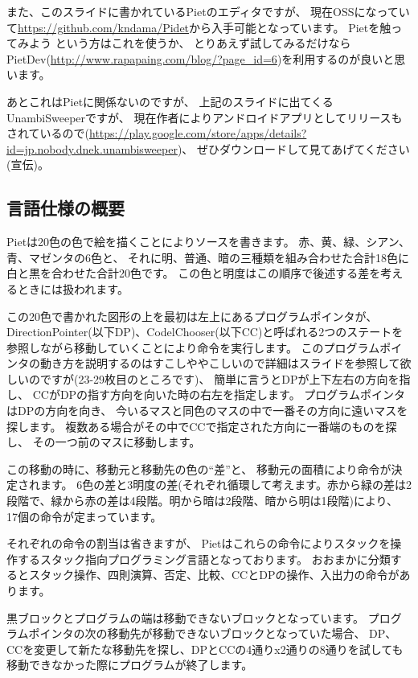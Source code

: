 また、このスライドに書かれているPietのエディタですが、
現在OSSになっていて\url{https://github.com/kndama/Pidet}から入手可能となっています。
Pietを触ってみよう という方はこれを使うか、
とりあえず試してみるだけならPietDev(\url{http://www.rapapaing.com/blog/?page\_id=6})を利用するのが良いと思います。

あとこれはPietに関係ないのですが、
上記のスライドに出てくるUnambiSweeperですが、
現在作者によりアンドロイドアプリとしてリリースもされているので(\url{https://play.google.com/store/apps/details?id=jp.nobody.dnek.unambisweeper})、
ぜひダウンロードして見てあげてください(宣伝)。

\subsection{言語仕様の概要}

Pietは20色の色で絵を描くことによりソースを書きます。
赤、黄、緑、シアン、青、マゼンタの6色と、
それに明、普通、暗の三種類を組み合わせた合計18色に白と黒を合わせた合計20色です。
この色と明度はこの順序で後述する差を考えるときには扱われます。

この20色で書かれた図形の上を最初は左上にあるプログラムポインタが、
DirectionPointer(以下DP)、CodelChooser(以下CC)と呼ばれる2つのステートを参照しながら移動していくことにより命令を実行します。
このプログラムポインタの動き方を説明するのはすこしややこしいので詳細はスライドを参照して欲しいのですが(23-29枚目のところです)、
簡単に言うとDPが上下左右の方向を指し、
CCがDPの指す方向を向いた時の右左を指定します。
プログラムポインタはDPの方向を向き、
今いるマスと同色のマスの中で一番その方向に遠いマスを探します。
複数ある場合がその中でCCで指定された方向に一番端のものを探し、
その一つ前のマスに移動します。

この移動の時に、移動元と移動先の色の``差''と、
移動元の面積により命令が決定されます。
6色の差と3明度の差(それぞれ循環して考えます。赤から緑の差は2段階で、緑から赤の差は4段階。明から暗は2段階、暗から明は1段階)により、
17個の命令が定まっています。

それぞれの命令の割当は省きますが、
Pietはこれらの命令によりスタックを操作するスタック指向プログラミング言語となっております。
おおまかに分類するとスタック操作、四則演算、否定、比較、CCとDPの操作、入出力の命令があります。

黒ブロックとプログラムの端は移動できないブロックとなっています。
プログラムポインタの次の移動先が移動できないブロックとなっていた場合、
DP、CCを変更して新たな移動先を探し、DPとCCの4通りx2通りの8通りを試しても移動できなかった際にプログラムが終了します。

